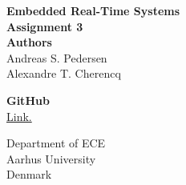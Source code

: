 \documentclass[../main.tex]{subfiles}
\begin{document}
\thispagestyle{empty}

\begin{titlepage}
    \begin{center}
        \vspace*{20pt}
        \textbf{\Huge{Embedded Real-Time Systems}} \\
        \vspace*{20pt}
        \textbf{\large{Assignment 3}} \\
        \vspace*{50pt}
        \textbf{\Large{Authors}} \\
        Andreas S. Pedersen     \\
        Alexandre T. Cherencq   \\

        \vspace{50pt}

        \textbf{\Large{GitHub}} \\
        \href{https://github.com/Ponti17/embedded-rt-systems-assignments}{Link.} \\
        \vfill

        \vspace*{1cm}

        Department of ECE\\
        Aarhus University\\
        Denmark
    \end{center}
\end{titlepage}
\end{document}
